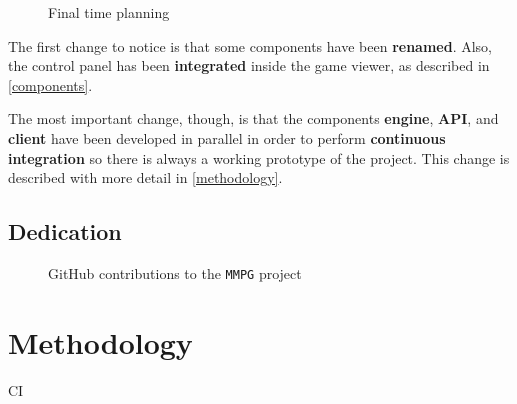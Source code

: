 \documentclass[a4paper,11pt]{article}
\begin{document}
\begin{figure}[!h]
\caption{Final time planning}
\label{gantt_current}
\end{figure}
The first change to notice is that some components have been \textbf{renamed}. Also, the control panel has been
\textbf{integrated} inside the game viewer, as described in \autoref{components}.

The most important change, though, is that the components \textbf{engine}, \textbf{API}, and \textbf{client} have been developed
in parallel in order to perform \textbf{continuous integration} so there is always a working prototype of the project.
This change is described with more detail in \autoref{methodology}.
\clearpage
\subsection{Dedication}
\begin{figure}[!h]
\caption{GitHub contributions to the \texttt{MMPG} project}
\label{dedication}
\end{figure}
\clearpage
\section{Methodology}
\label{methodology}
CI
\clearpage


\end{document}
